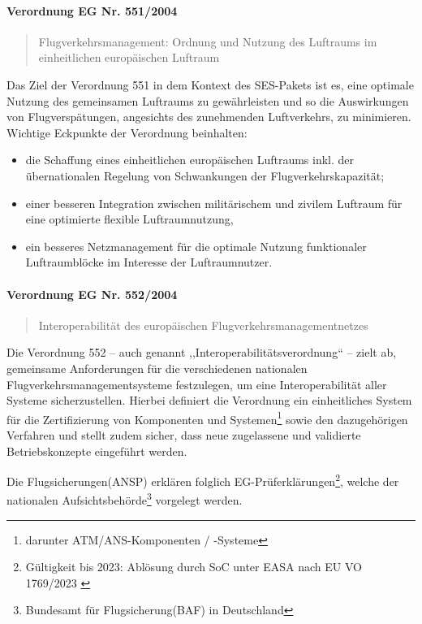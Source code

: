 \paragraph{Verordnung EG Nr. 551/2004} \label{er_551}
\begin{quote}
    Flugverkehrsmanagement: Ordnung und Nutzung des Luftraums im einheitlichen europäischen Luftraum  \cite{2004R0551, 2004R0551_summary}
\end{quote}
Das Ziel der Verordnung 551 in dem Kontext des SES-Pakets ist es, eine optimale Nutzung des gemeinsamen Luftraums zu gewährleisten und so die Auswirkungen von Flugverspätungen, angesichts des zunehmenden Luftverkehrs, zu minimieren. 
Wichtige Eckpunkte der Verordnung beinhalten: 
    \begin{itemize}
        \item die Schaffung eines einheitlichen europäischen Luftraums inkl. der übernationalen Regelung von Schwankungen der Flugverkehrskapazität;
        \item  einer besseren Integration zwischen militärischem und zivilem Luftraum für eine optimierte flexible Luftraumnutzung,
        \item ein besseres Netzmanagement für die optimale Nutzung funktionaler Luftraumblöcke im Interesse der Luftraumnutzer. \cite{2004R0551_summary}
    \end{itemize}

\pagebreak

\paragraph{Verordnung EG Nr. 552/2004} \label{er_552}

\begin{quote}
    Interoperabilität des europäischen Flugverkehrsmanagement\-netzes\cite{2004R0552, 2004R0552_summary}
\end{quote}
Die Verordnung 552 -- auch genannt ,,Interoperabilitätsverordnung`` -- zielt ab, gemeinsame Anforderungen für die verschiedenen nationalen Flugverkehrsmanagementsysteme festzulegen, um eine Interoperabilität aller Systeme sicherzustellen. \cite{2004R0552_summary}
Hierbei definiert die Verordnung ein einheitliches System für die Zertifizierung von Komponenten und Systemen\footnote{darunter ATM/ANS-Komponenten / -Systeme} sowie den dazugehörigen Verfahren und stellt zudem sicher, dass neue zugelassene und validierte Betriebskonzepte eingeführt werden. \cite[Art. 3 Abs. 1]{2004R0552}

Die Flugsicherungen(ANSP) erklären folglich EG-Prüferklärungen\footnote{Gültigkeit bis 2023: Ablösung durch SoC unter EASA nach EU VO 1769/2023 \cite{2023R1769}}, welche der nationalen Aufsichtsbehörde\footnote{Bundesamt für Flugsicherung(BAF) in Deutschland} vorgelegt werden. \cite[Art. 6 Abs. 1f]{2004R0552}


